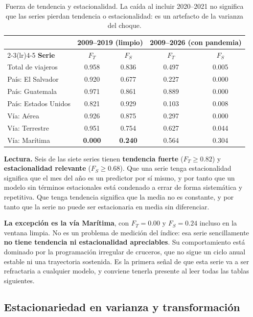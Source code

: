 \documentclass[12pt,letterpaper]{article}
\newcommand{\subseccion}[1]{\subsection{#1}}
\begin{document}
\begin{table}[H]
\centering
\small
\begin{tabular}{lcccc}
\toprule
& \multicolumn{2}{c}{\textbf{2009--2019 (limpio)}} & \multicolumn{2}{c}{\textbf{2009--2026 (con pandemia)}} \\
\cmidrule(lr){2-3}\cmidrule(lr){4-5}
\textbf{Serie} & $F_T$ & $F_S$ & $F_T$ & $F_S$ \\
\midrule
Total de viajeros      & 0.958 & 0.836 & 0.497 & 0.005 \\
País: El Salvador      & 0.920 & 0.677 & 0.227 & 0.000 \\
País: Guatemala        & 0.971 & 0.861 & 0.889 & 0.000 \\
País: Estados Unidos   & 0.821 & 0.929 & 0.103 & 0.008 \\
Vía: Aérea             & 0.926 & 0.875 & 0.297 & 0.000 \\
Vía: Terrestre         & 0.951 & 0.754 & 0.627 & 0.044 \\
Vía: Marítima          & \textbf{0.000} & \textbf{0.240} & 0.564 & 0.304 \\
\bottomrule
\end{tabular}
\caption{Fuerza de tendencia y estacionalidad. La caída al incluir 2020--2021 no significa que
las series pierdan tendencia o estacionalidad: es un artefacto de la varianza del choque.}
\end{table}

\textbf{Lectura.} Seis de las siete series tienen \textbf{tendencia fuerte} ($F_T \geq 0.82$) y
\textbf{estacionalidad relevante} ($F_S \geq 0.68$). Que una serie tenga estacionalidad
significa que el mes del año es un predictor por sí mismo, y por tanto que un modelo sin
términos estacionales está condenado a errar de forma sistemática y repetitiva. Que tenga
tendencia significa que la media no es constante, y por tanto que la serie no puede ser
estacionaria en media sin diferenciar.

\textbf{La excepción es la vía Marítima}, con $F_T = 0.00$ y $F_S = 0.24$ incluso en la ventana
limpia. No es un problema de medición del índice: esa serie sencillamente \textbf{no tiene
tendencia ni estacionalidad apreciables}. Su comportamiento está dominado por la programación
irregular de cruceros, que no sigue un ciclo anual estable ni una trayectoria sostenida. Es la
primera señal de que esta serie va a ser refractaria a cualquier modelo, y conviene tenerla
presente al leer todas las tablas siguientes.

\subseccion{Estacionariedad en varianza y transformación}
\label{sec:varianza}
\end{document}
